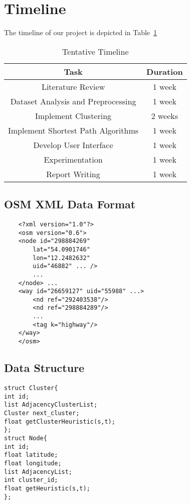 \section{Timeline}
\label{sec:timeline}

The timeline of our project is depicted in Table~\ref{table:timeline}

\begin{table}[]
	\caption{Tentative Timeline}
	\begin{tabular}{|| c c ||} 
		\hline
		Task & Duration \\
		[0.5ex] 
		\hline\hline
        Literature Review & 1 week​ \\
        Dataset Analysis and Preprocessing​ & 1 week​ \\
		Implement Clustering​ & 2 weeks​ \\
		Implement Shortest Path Algorithms & 1 week​ \\
		Develop User Interface & 1 week​ \\
        Experimentation​ & 1 week​ \\
        Report Writing​ & 1 week​ \\[1ex] 
		\hline
	\end{tabular}
	\label{table:timeline}
\end{table}

\appendix

\subsection{OSM XML Data Format}
\label{app:osm_data}
\begin{verbatim}
	<?xml version="1.0"?>
	<osm version="0.6">
	<node id="298884269"
		lat="54.0901746"
		lon="12.2482632"
		uid="46882" ... />
		...
	</node> ...
	<way id="26659127" uid="55988" ...>
		<nd ref="292403538"/>
		<nd ref="298884289"/>
		...
		<tag k="highway"/>
	</way>
	</osm>
\end{verbatim}

\subsection{Data Structure}
\label{app:data_structure}
\begin{verbatim}
struct Cluster{​
int id;
list AdjacencyClusterList;
Cluster next_cluster;
float getClusterHeuristic(s,t);
};
struct Node{
int id;
float latitude;
float longitude;​
list AdjacencyList;
int cluster_id;
float getHeuristic(s,t)​;
};
\end{verbatim}